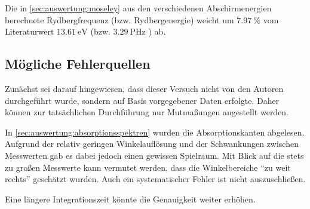 Die in \autoref{sec:auswertung:moseley} aus den verschiedenen Abschirmenergien berechnete
Rydbergfrequenz (bzw. Rydbergenergie)
weicht um $\SI{7.97}{\percent}$ vom Literaturwert
$\SI{13.61}{\electronvolt}$ \cite{rydhcev} (bzw. $\SI{3.29}{\peta\hertz}$ \cite{rydchz})
ab.


\subsection{Mögliche Fehlerquellen}

Zunächst sei darauf hingewiesen,
dass dieser Versuch nicht von den Autoren durchgeführt wurde,
sondern auf Basis vorgegebener Daten erfolgte.
Daher können zur tatsächlichen Durchführung nur Mutmaßungen angestellt werden.


In \autoref{sec:auswertung:absorptionsspektren} wurden die Absorptionskanten abgelesen.
Aufgrund der relativ geringen Winkelauflösung und der Schwankungen zwischen Messwerten
gab es dabei jedoch einen gewissen Spielraum.
Mit Blick auf die stets zu großen Messwerte kann vermutet werden,
dass die Winkelbereiche \enquote{zu weit rechts} geschätzt wurden.
Auch ein systematischer Fehler ist nicht auszuschließen.

Eine längere Integrationszeit könnte die Genauigkeit weiter erhöhen.

